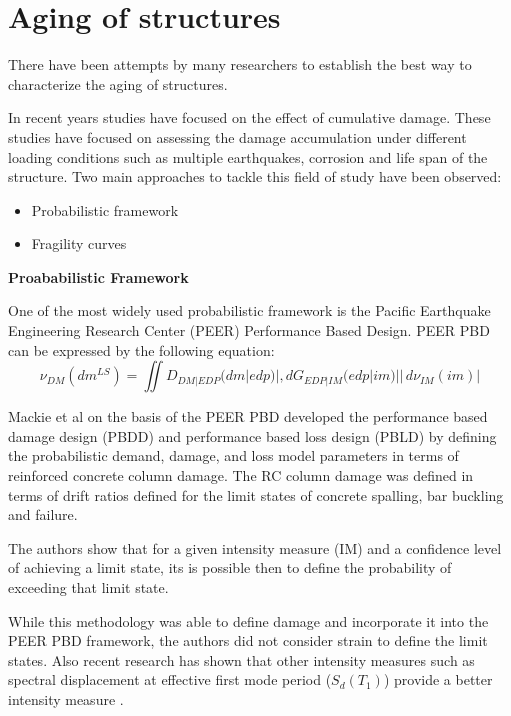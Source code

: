 \section{Aging of structures}

There have been attempts by many researchers to establish the best way to characterize the aging of structures.

In recent years studies have focused on the effect of cumulative damage. These studies have focused on assessing the damage accumulation under different loading conditions such as multiple earthquakes, corrosion and life span of the structure. Two main approaches to tackle this field of study have been observed:

\begin{itemize}
	\item Probabilistic framework
	\item Fragility curves
\end{itemize}

\textbf{Proababilistic Framework}

One of the most widely used probabilistic framework is the Pacific Earthquake Engineering Research Center (PEER) Performance Based Design. PEER PBD can be expressed by the following equation:
\begin{equation}
\nu_{DM}(dm^{LS})=\iint D_{DM|EDP}(dm|edp)|,dG_{EDP|IM}(edp|im)||\,d\nu_{IM}(im)|
\end{equation}

Mackie et al \cite{Mackie2007} on the basis of the PEER PBD developed the performance based damage design (PBDD) and performance based loss design (PBLD) by defining the probabilistic demand, damage, and loss model parameters in terms of reinforced concrete column damage. The RC column damage was defined in terms of drift ratios defined for the limit states of concrete spalling, bar buckling and failure. 

The authors show that for a given intensity measure (IM) and a confidence level of achieving a limit state, its is possible then to define the probability  of exceeding that limit state.

While this methodology was able to define damage and incorporate it into the PEER PBD framework, the authors did not consider  strain to define the limit states. Also recent research has shown that other intensity measures such as spectral displacement at effective first mode period ($S_{d}(T_{1})$) provide a better intensity measure \cite{Krish2018}.

